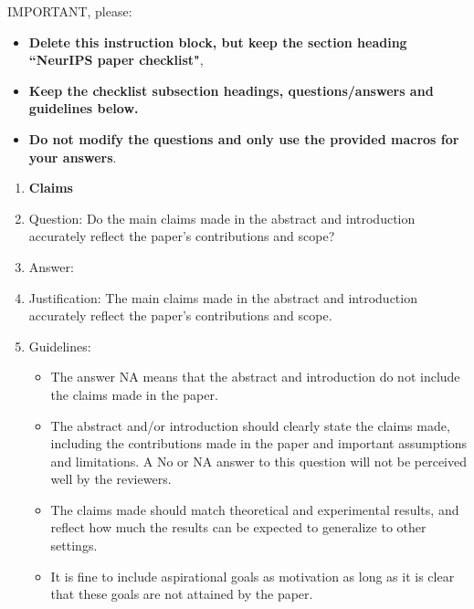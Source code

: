 \documentclass{article}
\begin{document}
IMPORTANT, please:
\begin{itemize}
    \item {\bf Delete this instruction block, but keep the section heading ``NeurIPS paper checklist"},
    \item  {\bf Keep the checklist subsection headings, questions/answers and guidelines below.}
    \item {\bf Do not modify the questions and only use the provided macros for your answers}.
\end{itemize} 
 

\fi

\begin{enumerate}

\item {\bf Claims}
    \item[] Question: Do the main claims made in the abstract and introduction accurately reflect the paper's contributions and scope?
    \item[] Answer: \answerYes{} %
    \item[] Justification: The main claims made in the abstract and introduction accurately reflect the paper’s contributions and scope.
    \item[] Guidelines:
    \begin{itemize}
        \item The answer NA means that the abstract and introduction do not include the claims made in the paper.
        \item The abstract and/or introduction should clearly state the claims made, including the contributions made in the paper and important assumptions and limitations. A No or NA answer to this question will not be perceived well by the reviewers. 
        \item The claims made should match theoretical and experimental results, and reflect how much the results can be expected to generalize to other settings. 
        \item It is fine to include aspirational goals as motivation as long as it is clear that these goals are not attained by the paper. 
    \end{itemize}


\end{enumerate}
\end{document}
